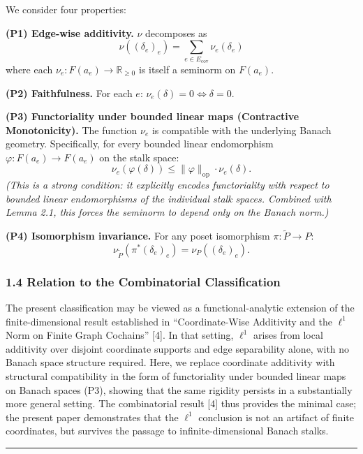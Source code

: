 \documentclass[
]{article}
\begin{document}
We consider four properties:

\textbf{(P1) Edge-wise additivity.} \(\nu\) decomposes as
\[\nu((\delta_e)_e) = \sum_{e \in E_{\text{cov}}} \nu_e(\delta_e)\]
where each \(\nu_e: F(a_e) \to \mathbb{R}_{\geq 0}\) is itself a
seminorm on \(F(a_e)\).

\textbf{(P2) Faithfulness.} For each \(e\):
\(\nu_e(\delta) = 0 \iff \delta = 0\).

\textbf{(P3) Functoriality under bounded linear maps (Contractive
Monotonicity).} The function \(\nu_e\) is compatible with the underlying
Banach geometry. Specifically, for every bounded linear endomorphism
\(\varphi: F(a_e) \to F(a_e)\) on the stalk space:
\[\nu_e(\varphi(\delta)) \leq \|\varphi\|_{\text{op}} \cdot \nu_e(\delta).\]
\emph{(This is a strong condition: it explicitly encodes functoriality
with respect to bounded linear endomorphisms of the individual stalk
spaces. Combined with Lemma 2.1, this forces the seminorm to depend only
on the Banach norm.)}

\textbf{(P4) Isomorphism invariance.} For any poset isomorphism
\(\pi: \tilde{P} \to P\):
\[\nu_{\tilde{P}}(\pi^*(\delta_e)_e) = \nu_P((\delta_e)_e).\]

\subsubsection{1.4 Relation to the Combinatorial
Classification}\label{relation-to-the-combinatorial-classification}

The present classification may be viewed as a functional-analytic
extension of the finite-dimensional result established in
``Coordinate-Wise Additivity and the \(\ell^1\) Norm on Finite Graph
Cochains'' {[}4{]}. In that setting, \(\ell^1\) arises from local
additivity over disjoint coordinate supports and edge separability
alone, with no Banach space structure required. Here, we replace
coordinate additivity with structural compatibility in the form of
functoriality under bounded linear maps on Banach spaces (P3), showing
that the same rigidity persists in a substantially more general setting.
The combinatorial result {[}4{]} thus provides the minimal case; the
present paper demonstrates that the \(\ell^1\) conclusion is not an
artifact of finite coordinates, but survives the passage to
infinite-dimensional Banach stalks.

\begin{center}\rule{0.5\linewidth}{0.5pt}\end{center}
\end{document}
